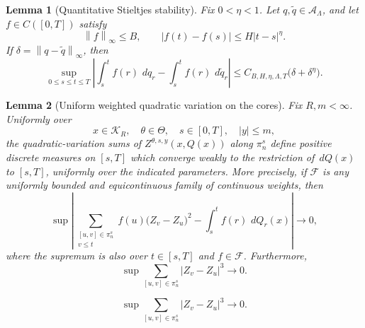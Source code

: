 \documentclass[10pt,a4paper]{amsart}
\newtheorem{lemma}{Lemma}
\newcommand{\abs}[1]{\left\lvert #1\right\rvert}
\newcommand{\cK}{\mathcal K}
\newcommand{\dd}{\,d}
\newcommand{\norm}[1]{\left\lVert #1\right\rVert}
\begin{document}
\begin{lemma}[Quantitative Stieltjes stability]
\label{lem:quantitative-stieltjes}
Fix \(0<\eta<1\).  Let \(q,\widetilde q\in\mathcal A_\Lambda\), and let
\(f\in C([0,T])\) satisfy
\[
  \norm{f}_\infty\le B,
  \qquad
  \abs{f(t)-f(s)}\le H\abs{t-s}^\eta.
\]
If \(\delta=\norm{q-\widetilde q}_\infty\), then
\begin{equation}\label{eq:quantitative-stieltjes}
  \sup_{0\le s\le t\le T}
  \left|
    \int_s^t f(r)\,\dd q_r
    -\int_s^t f(r)\,\dd\widetilde q_r
  \right|
  \le C_{B,H,\eta,\Lambda,T}
  \bigl(\delta+\delta^\eta\bigr).
\end{equation}
\end{lemma}

\begin{lemma}[Uniform weighted quadratic variation on the cores]
\label{lem:uniform-weighted-qv}
Fix \(R,m<\infty\).  Uniformly over
\[
  x\in\cK_R,\quad \theta\in\Theta,\quad
  s\in[0,T],\quad \abs{y}\le m,
\]
the quadratic-variation sums of
\(Z^{\theta,s,y}(x,Q(x))\) along \(\pi_n^s\) define positive discrete
measures on \([s,T]\) which converge weakly to the restriction of
\(\dd Q(x)\) to \([s,T]\), uniformly over the indicated parameters.  More
precisely, if \(\mathscr F\) is any uniformly bounded and equicontinuous
family of continuous weights, then
\begin{equation}\label{eq:uniform-weighted-qv}
  \sup
  \left|
    \sum_{\substack{[u,v]\in\pi_n^s\\v\le t}}
      f(u)\bigl(Z_v-Z_u\bigr)^2
    -
    \int_s^t f(r)\,\dd Q_r(x)
  \right|
  \longrightarrow0,
\end{equation}
where the supremum is also over \(t\in[s,T]\) and \(f\in\mathscr F\).
Furthermore,
\begin{equation}\label{eq:uniform-cubic-remainder}
  \sup
  \sum_{[u,v]\in\pi_n^s}
  \abs{Z_v-Z_u}^3
  \longrightarrow0.
\end{equation}
\end{lemma}

\begin{equation}
  \sup
  \sum_{[u,v]\in\pi_n^s}
  \abs{Z_v-Z_u}^3
  \longrightarrow0.
\end{equation}
\end{document}
